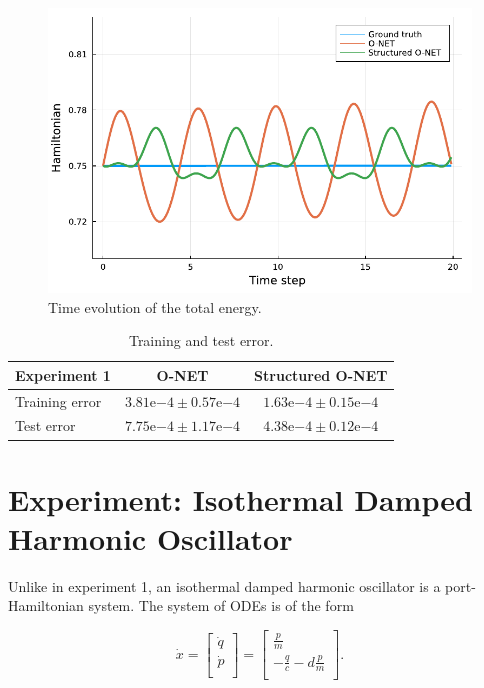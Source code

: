 \documentclass[
	parskip, 			   %
	twoside, 			   %
	DIV=14, 			   %
	BCOR=15.0mm, 		   %
	headsepline, 		   %
	open=right, 		   %
	captions=tableheading, %
	bibliography=totoc,    %
	numbers=noenddot       %
]{scrreprt}
\begin{document}
\begin{figure}[h!]
    \centering
    \includegraphics[scale=1]{figures/Hamiltonian_structured_O_NET.pdf}
    \caption{Time evolution of the total energy.}
    \label{fig:Hamiltonian_error_structured_O_NET}
\end{figure}

\begin{table}[h!]
	\centering
	\caption{Training and test error.}
	\label{tab:error_experiment1}
	\begin{tabularx}{\textwidth}{lcc}
		\toprule
		\textbf{Experiment 1} & \textbf{O-NET} & \textbf{Structured O-NET}\\
		\midrule
		Training error & $3.81\mathrm{e}{-4} \pm 0.57\mathrm{e}{-4}$ & $1.63\mathrm{e}{-4} \pm 0.15\mathrm{e}{-4}$ \\
		Test error & $7.75\mathrm{e}{-4} \pm 1.17\mathrm{e}{-4}$ & $4.38\mathrm{e}{-4} \pm 0.12\mathrm{e}{-4}$ \\
		\bottomrule
	\end{tabularx}
\end{table}



\clearpage
\section{Experiment: Isothermal Damped Harmonic Oscillator}
Unlike in experiment 1, an isothermal damped harmonic oscillator is a port-Hamiltonian system. The system of ODEs is of the form

\begin{equation}
    \label{eq:ODE_idho}
    \dot{x} =
    \begin{bmatrix}
    \dot{q}\\
    \dot{p}\\
    \end{bmatrix}
    =
    \begin{bmatrix}
    \frac{p}{m}\\
    -\frac{q}{c}-d\frac{p}{m}\\
    \end{bmatrix}.
\end{equation}
\end{document}
